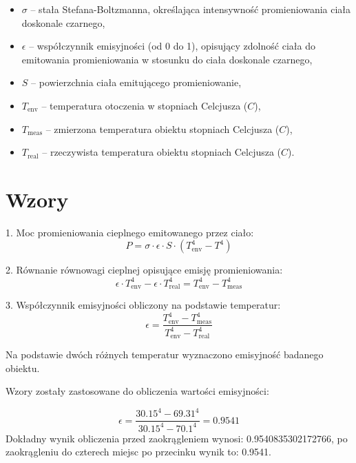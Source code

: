 \begin{itemize}
    \item \(\sigma\) – stała Stefana-Boltzmanna, określająca intensywność promieniowania ciała doskonale czarnego,
    \item \(\epsilon\) – współczynnik emisyjności (od 0 do 1), opisujący zdolność ciała do emitowania promieniowania w stosunku do ciała doskonale czarnego,
    \item \(S\) – powierzchnia ciała emitującego promieniowanie,
    \item \(T_{\text{env}}\) – temperatura otoczenia w stopniach Celcjusza (\(C\)),
    \item \(T_{\text{meas}}\) – zmierzona temperatura obiektu stopniach Celcjusza (\(C\)),
    \item \(T_{\text{real}}\) – rzeczywista temperatura obiektu stopniach Celcjusza (\(C\)).
\end{itemize}

\newpage

\section{Wzory}
1. Moc promieniowania cieplnego emitowanego przez ciało:
\[
P = \sigma \cdot \epsilon \cdot S \cdot \left( T_{\text{env}}^4 - T^4 \right)
\]

2. Równanie równowagi cieplnej opisujące emisję promieniowania:
\[
\epsilon \cdot T_{\text{env}}^4 - \epsilon \cdot T_{\text{real}}^4 = T_{\text{env}}^4 - T_{\text{meas}}^4
\]

3. Współczynnik emisyjności obliczony na podstawie temperatur:
\[
\epsilon = \frac{T_{\text{env}}^4 - T_{\text{meas}}^4}{T_{\text{env}}^4 - T_{\text{real}}^4}
\]

Na podstawie dwóch różnych temperatur wyznaczono emisyjność badanego obiektu. 

\vspace{12pt}

Wzory zostały zastosowane do obliczenia wartości emisyjności:

\[
\epsilon = \frac{30.15^4 - 69.31^4}{30.15^4 - 70.1^4} = 0.9541
\]
Dokładny wynik obliczenia przed zaokrągleniem wynosi: 0.9540835302172766, po zaokrągleniu do czterech miejsc po przecinku wynik to: 0.9541.